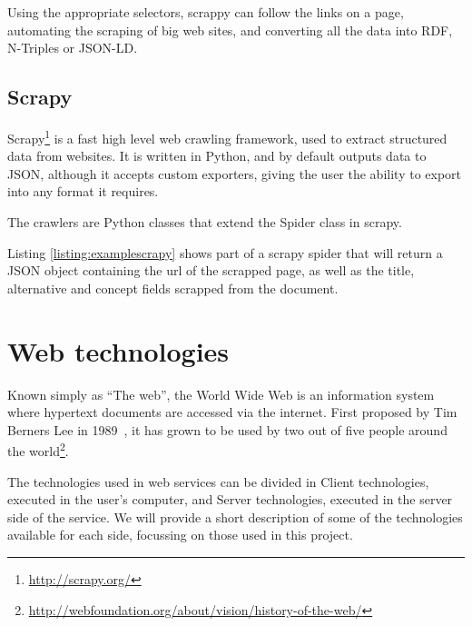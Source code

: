 \begin{center}
  
\end{center}

Using the appropriate selectors, scrappy can follow the links on a page, automating the scraping of big web sites, and converting all the data into RDF, N-Triples or JSON-LD.

\subsection{Scrapy}

Scrapy\footnote{\url{http://scrapy.org/}} is a fast high level web crawling framework, used to extract structured data from websites. It is written in Python, and by default outputs data to JSON, although it accepts custom exporters, giving the user the ability to export into any format it requires.

The crawlers are Python classes that extend the Spider class in scrapy.

\begin{center}
  
\end{center}

Listing \ref{listing:examplescrapy} shows part of a scrapy spider that will return a JSON object containing the url of the scrapped page, as well as the title, alternative and concept fields scrapped from the document.

\section{Web technologies}


Known simply as ``The web'', the World Wide Web is an information system where hypertext documents are accessed via the internet. First proposed by Tim Berners Lee in 1989~\cite{berners1989information}, it has grown to be used by two out of five people around the world\footnote{\url{http://webfoundation.org/about/vision/history-of-the-web/}}.

The technologies used in web services can be divided in Client technologies, executed in the user's computer, and Server technologies, executed in the server side of the service. We will provide a short description of some of the technologies available for each side, focussing on those used in this project.

